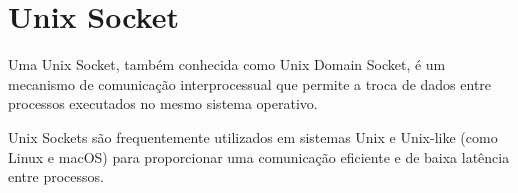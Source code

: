 \begin{comment}
As solicitações \textit{HTTP} possuí as seguintes operações:
\begin{itemize}
    \item GET - Usado para solicitar dados de um recurso específico;
    \item HEAD - Similar ao GET, mas só retorna os cabeçalhos da resposta sem o corpo;
    \item POST - Enviar dados ao servidor para criar um novo recurso; 
    \item PUT - Atualizar um recurso específico com dados novos;
    \item PATCH - Atualizar parcialmente um recurso existente; 
    \item DELETE - Usado para apagar um recurso específico; 
    \item CONNECT - Principalmente usado para iniciar uma comunicação
    segura (via SSL/TLS) com um servidor proxy; 
    \item OPTIONS - Usado para descobrir os métodos suportados pelo servidor para um recurso específico;
    \item TRACE - Usado para depurar e rastrear o caminho que uma solicitação HTTP percorre.
\end{itemize}


Os principais formatos de texto a serem enviados nas solicitações são:
\begin{itemize}
    \item HTML;
    \item JSON;
    \item XML.
\end{itemize}

\end{comment}


\section{Unix Socket}

Uma Unix Socket, também conhecida como Unix Domain Socket, 
é um mecanismo de comunicação interprocessual  que permite a troca de dados 
entre processos executados no mesmo sistema operativo.

Unix Sockets são frequentemente utilizados em sistemas Unix e Unix-like
(como Linux e macOS) para proporcionar uma comunicação eficiente e de baixa 
latência entre processos.



